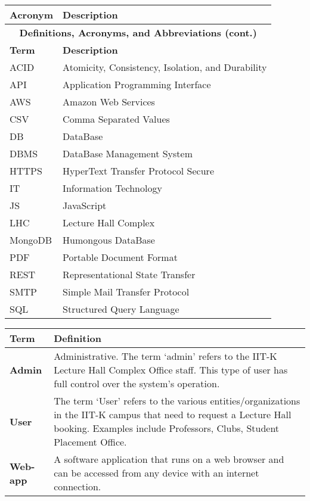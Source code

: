 \documentclass[a4paper,12pt]{article}
\begin{document}
\renewcommand{\arraystretch}{1.8}
\begin{longtable}{|m{4cm}|m{12cm}|}
\hline
\textbf{Acronym} & \textbf{Description} \\
\hline
\endfirsthead
\hline
\multicolumn{2}{|c|}{\textbf{Definitions, Acronyms, and Abbreviations (cont.)}} \\
\hline
\textbf{Term} & \textbf{Description} \\
\hline
\endhead
\hline
\endfoot
\hline
\endlastfoot
ACID & Atomicity, Consistency, Isolation, and Durability \\ \hline
API & Application Programming Interface \\ \hline
AWS & Amazon Web Services \\ \hline
CSV & Comma Separated Values \\ \hline
DB & DataBase \\ \hline
DBMS & DataBase Management System \\ \hline
HTTPS & HyperText Transfer Protocol Secure \\ \hline
IT & Information Technology \\ \hline
JS & JavaScript \\ \hline
LHC & Lecture Hall Complex \\ \hline
MongoDB & Humongous DataBase \\ \hline
PDF & Portable Document Format \\ \hline
REST & Representational State Transfer \\ \hline
SMTP & Simple Mail Transfer Protocol \\ \hline
SQL & Structured Query Language \\ \hline
\end{longtable}


\begin{table}[h!]
\centering
\renewcommand{\arraystretch}{1.8}
\begin{tabular}{|m{4cm}|m{12cm}|} %
\hline
\textbf{Term} & \textbf{Definition} \\ \hline 
\textbf{Admin} & \parbox[t]{11cm}{Administrative. The term ‘admin’ refers to the IIT-K Lecture Hall Complex Office staff. This type of user has full control over the system’s operation.}
\\ \hline
\textbf{User} & \parbox[t]{11cm}{The term ‘User’ refers to the various entities/organizations in the IIT-K campus that need to request a Lecture Hall booking. Examples include Professors, Clubs, Student Placement Office.}
\\ \hline
\textbf{Web-app} & \parbox[t]{11cm}{A software application that runs on a web browser and can be accessed from any device with an internet connection.} 
\\ \hline
\end{tabular}

\label{tab:definitions}
\end{table}
\end{document}
